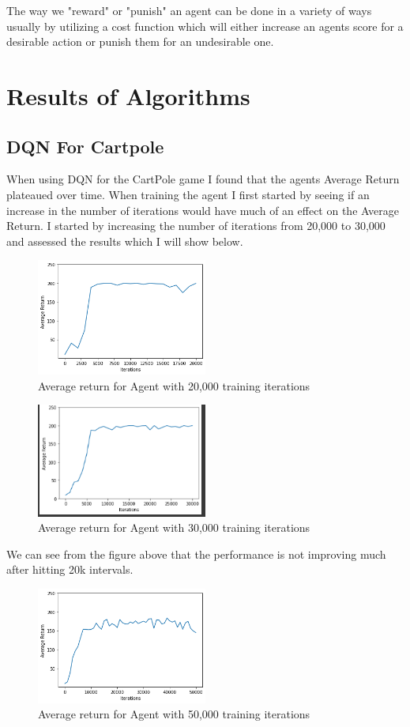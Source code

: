 \documentclass[conference]{IEEEtran}
\begin{document}
The way we "reward" or "punish" an agent can be done in a variety of ways usually by utilizing a cost function which will either increase an agents score for a desirable action or punish them for an undesirable one.

\section{Results of Algorithms}
\subsection{DQN For Cartpole}
When using DQN for the CartPole game I found that the agents Average Return plateaued over time.  When training the agent I first started by seeing if an increase in the number of iterations would have much of an effect on the Average Return.  I started by increasing the number of iterations from 20,000 to 30,000 and assessed the results which I will show below.
\begin{figure}[h]
\caption{Average return for Agent with 20,000 training iterations}
\centering
\includegraphics[width=0.5\textwidth]{Images/DQN20k.png}
\end{figure}
\begin{figure}[H]
\caption{Average return for Agent with 30,000 training iterations}
\centering
\includegraphics[width=0.5\textwidth]{Images/DQN30k.png}
\end{figure}
We can see from the figure above that the performance is not improving much after hitting 20k intervals. 
\begin{figure}[H]
\caption{Average return for Agent with 50,000 training iterations}
\centering
\includegraphics[width=0.5\textwidth]{Images/DQN50k.png}
\end{figure}
\end{document}
